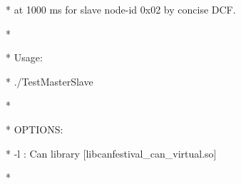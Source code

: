 \documentclass[a4paper,12pt]{book}
\begin{document}
{\ttfamily
* \space at 1000 ms for slave node{}-id 0x02 by concise DCF.
\space \space \space \space \space \space \space \space *}

{\ttfamily
*
\space \space \space \space \space \space \space \space \space \space \space \space \space \space \space \space \space \space \space \space \space \space \space \space \space \space \space \space \space \space \space \space \space \space \space \space \space \space \space \space \space \space \space \space \space \space \space \space \space \space \space \space \space \space \space \space \space \space \space *}

{\ttfamily
* \space \space Usage:
\space \space \space \space \space \space \space \space \space \space \space \space \space \space \space \space \space \space \space \space \space \space \space \space \space \space \space \space \space \space \space \space \space \space \space \space \space \space \space \space \space \space \space \space \space \space \space \space \space \space *}

{\ttfamily
* \space \space ./TestMasterSlave \space [OPTIONS]
\space \space \space \space \space \space \space \space \space \space \space \space \space \space \space \space \space \space \space \space \space \space \space \space \space \space \space \space *}

{\ttfamily
*
\space \space \space \space \space \space \space \space \space \space \space \space \space \space \space \space \space \space \space \space \space \space \space \space \space \space \space \space \space \space \space \space \space \space \space \space \space \space \space \space \space \space \space \space \space \space \space \space \space \space \space \space \space \space \space \space \space \space \space *}

{\ttfamily
* \space \space OPTIONS:
\space \space \space \space \space \space \space \space \space \space \space \space \space \space \space \space \space \space \space \space \space \space \space \space \space \space \space \space \space \space \space \space \space \space \space \space \space \space \space \space \space \space \space \space \space \space \space \space *}

{\ttfamily
* \space \space \space \space {}-l : Can library
[{\textquotedbl}libcanfestival\_can\_virtual.so{\textquotedbl}]
\space \space \space \space *}

{\ttfamily
*
\space \space \space \space \space \space \space \space \space \space \space \space \space \space \space \space \space \space \space \space \space \space \space \space \space \space \space \space \space \space \space \space \space \space \space \space \space \space \space \space \space \space \space \space \space \space \space \space \space \space \space \space \space \space \space \space \space \space \space *}
\end{document}

